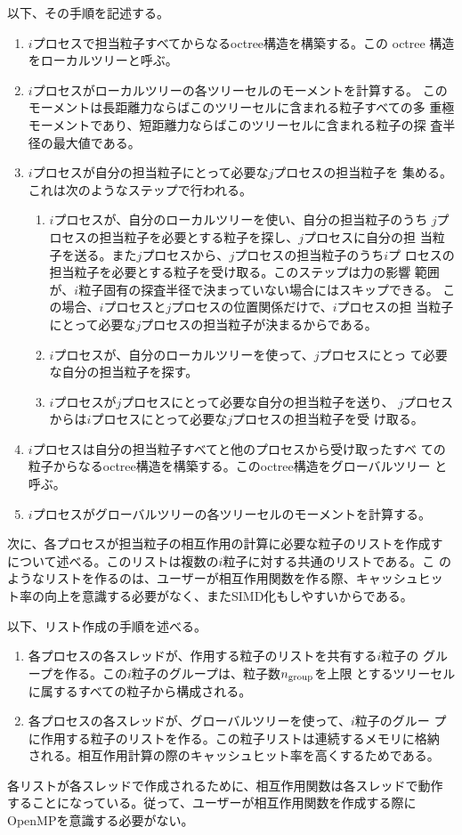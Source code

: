 \documentclass[12pt,a4paper]{jarticle}
\begin{document}
以下、その手順を記述する。
\begin{enumerate}
\item $i$プロセスで担当粒子すべてからなるoctree構造を構築する。この
  octree 構造をローカルツリーと呼ぶ。
\item $i$プロセスがローカルツリーの各ツリーセルのモーメントを計算する。
  このモーメントは長距離力ならばこのツリーセルに含まれる粒子すべての多
  重極モーメントであり、短距離力ならばこのツリーセルに含まれる粒子の探
  査半径の最大値である。
\item $i$プロセスが自分の担当粒子にとって必要な$j$プロセスの担当粒子を
  集める。これは次のようなステップで行われる。
  \begin{enumerate}
  \item $i$プロセスが、自分のローカルツリーを使い、自分の担当粒子のうち
    $j$プロセスの担当粒子を必要とする粒子を探し、$j$プロセスに自分の担
    当粒子を送る。また$j$プロセスから、$j$プロセスの担当粒子のうち$i$プ
    ロセスの担当粒子を必要とする粒子を受け取る。このステップは力の影響
    範囲が、$i$粒子固有の探査半径で決まっていない場合にはスキップできる。
    この場合、$i$プロセスと$j$プロセスの位置関係だけで、$i$プロセスの担
    当粒子にとって必要な$j$プロセスの担当粒子が決まるからである。
  \item $i$プロセスが、自分のローカルツリーを使って、$j$プロセスにとっ
    て必要な自分の担当粒子を探す。
  \item $i$プロセスが$j$プロセスにとって必要な自分の担当粒子を送り、
    $j$プロセスからは$i$プロセスにとって必要な$j$プロセスの担当粒子を受
    け取る。
  \end{enumerate}
\item $i$プロセスは自分の担当粒子すべてと他のプロセスから受け取ったすべ
  ての粒子からなるoctree構造を構築する。このoctree構造をグローバルツリー
  と呼ぶ。
\item $i$プロセスがグローバルツリーの各ツリーセルのモーメントを計算する。
\end{enumerate}

次に、各プロセスが担当粒子の相互作用の計算に必要な粒子のリストを作成す
について述べる。このリストは複数の$i$粒子に対する共通のリストである。こ
のようなリストを作るのは、ユーザーが相互作用関数を作る際、キャッシュヒッ
ト率の向上を意識する必要がなく、またSIMD化もしやすいからである。

以下、リスト作成の手順を述べる。
\begin{enumerate}
\item 各プロセスの各スレッドが、作用する粒子のリストを共有する$i$粒子の
  グループを作る。この$i$粒子のグループは、粒子数$n_{\rm group}$を上限
  とするツリーセルに属するすべての粒子から構成される。
\item 各プロセスの各スレッドが、グローバルツリーを使って、$i$粒子のグルー
  プに作用する粒子のリストを作る。この粒子リストは連続するメモリに格納
  される。相互作用計算の際のキャッシュヒット率を高くするためである。
\end{enumerate}
各リストが各スレッドで作成されるために、相互作用関数は各スレッドで動作
することになっている。従って、ユーザーが相互作用関数を作成する際に
OpenMPを意識する必要がない。
\end{document}
